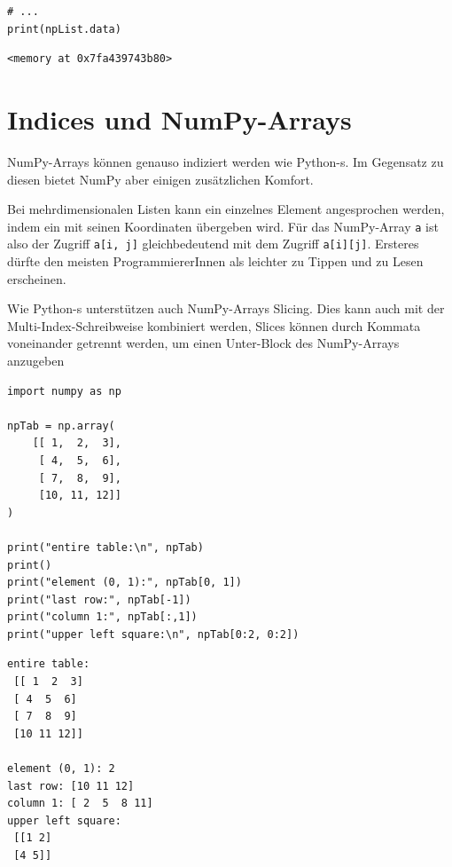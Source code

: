 \begin{tcbraster}[raster columns=2,
                  raster equal height,
                  nobeforeafter,
                  raster column skip=0.5cm]
\begin{codebox}
\begin{verbatim}
# ...
print(npList.data)
\end{verbatim}
\end{codebox}
%
\begin{cmdbox}
\begin{verbatim}
<memory at 0x7fa439743b80>
\end{verbatim}
\end{cmdbox}
\end{tcbraster}

\section{Indices und NumPy-Arrays}
NumPy-Arrays können genauso indiziert werden wie Python-s. Im Gegensatz zu diesen bietet NumPy aber einigen zusätzlichen Komfort.

Bei mehrdimensionalen Listen kann ein einzelnes Element angesprochen werden, indem ein  mit seinen Koordinaten übergeben wird. Für das NumPy-Array \texttt{a} ist also der Zugriff \texttt{a[i, j]} gleichbedeutend mit dem Zugriff \texttt{a[i][j]}. Ersteres dürfte den meisten ProgrammiererInnen als leichter zu Tippen und zu Lesen erscheinen.

Wie Python-s unterstützen auch NumPy-Arrays Slicing. Dies kann auch mit der Multi-Index-Schreibweise kombiniert werden, \ie Slices können durch Kommata voneinander getrennt werden, um einen Unter-Block des NumPy-Arrays anzugeben
\begin{codebox}
\begin{verbatim}
import numpy as np

npTab = np.array(
    [[ 1,  2,  3],
     [ 4,  5,  6],
     [ 7,  8,  9],
     [10, 11, 12]]
)

print("entire table:\n", npTab)
print()
print("element (0, 1):", npTab[0, 1])
print("last row:", npTab[-1])
print("column 1:", npTab[:,1])
print("upper left square:\n", npTab[0:2, 0:2])
\end{verbatim}
\end{codebox}

\begin{cmdbox}
\begin{verbatim}
entire table:
 [[ 1  2  3]
 [ 4  5  6]
 [ 7  8  9]
 [10 11 12]]

element (0, 1): 2
last row: [10 11 12]
column 1: [ 2  5  8 11]
upper left square:
 [[1 2]
 [4 5]]
\end{verbatim}
\end{cmdbox}

